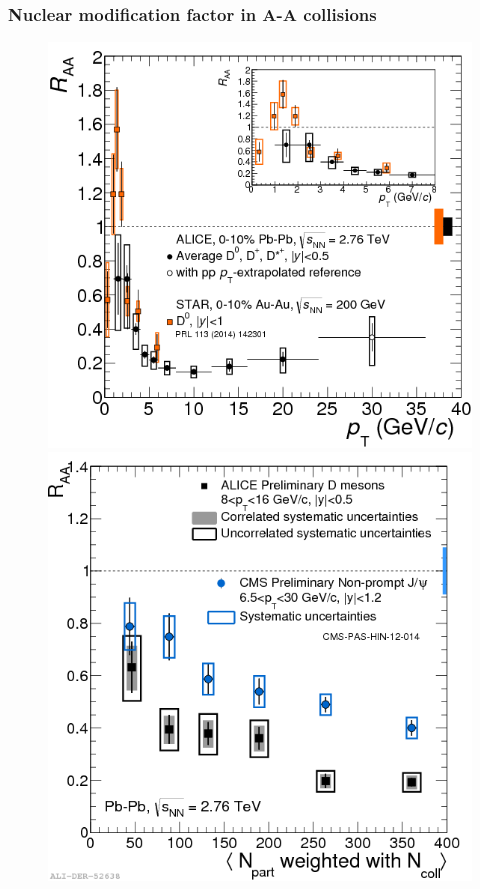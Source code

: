 \documentclass[b5paper,10pt,twoside,oldstyle,classica]{toptesi}
\begin{document}
\subsubsection{Nuclear modification factor in A-A collisions}
\begin{figure}[tb]
\begin{center}
\includegraphics[scale = 0.3]{AverageDmesonRaa_010_DzeroSTAR_010.png}
\hspace{0.cm}
{\includegraphics[scale = 0.283]{figures_PbPb_nonPromptJpsiCMS_wNpart.png}}

\end{center}
\end{figure}
\end{document}
